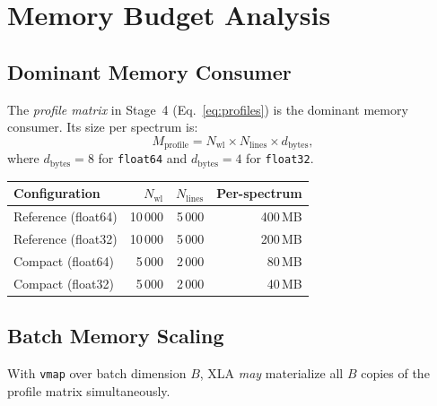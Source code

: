\documentclass[11pt]{article}
\begin{document}
\section{Memory Budget Analysis}
\label{sec:memory}

\subsection{Dominant Memory Consumer}
\label{sec:dominant}

The \emph{profile matrix} in Stage~4 (Eq.~\ref{eq:profiles}) is
the dominant memory consumer. Its size per spectrum is:
\begin{equation}
  \label{eq:mem-profile}
  M_\mathrm{profile} = N_\mathrm{wl} \times N_\mathrm{lines} \times d_\mathrm{bytes},
\end{equation}
where $d_\mathrm{bytes} = 8$ for \texttt{float64} and $d_\mathrm{bytes} = 4$ for
\texttt{float32}.

\begin{center}
\begin{tabular}{lrrr}
\toprule
\textbf{Configuration} & $N_\mathrm{wl}$ & $N_\mathrm{lines}$ & \textbf{Per-spectrum} \\
\midrule
Reference (float64)  & 10\,000 & 5\,000 & 400\,MB \\
Reference (float32)  & 10\,000 & 5\,000 & 200\,MB \\
Compact (float64)    &  5\,000 & 2\,000 &  80\,MB \\
Compact (float32)    &  5\,000 & 2\,000 &  40\,MB \\
\bottomrule
\end{tabular}
\end{center}

\subsection{Batch Memory Scaling}
\label{sec:batch-scaling}

With \texttt{vmap} over batch dimension $B$, XLA \emph{may} materialize
all $B$ copies of the profile matrix simultaneously.
\end{document}
